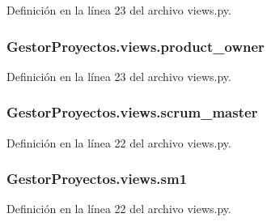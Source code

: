 Definición en la línea 23 del archivo views.\+py.

\subsubsection[{\texorpdfstring{product\+\_\+owner}{product_owner}}]{\setlength{\rightskip}{0pt plus 5cm}Gestor\+Proyectos.\+views.\+product\+\_\+owner}\hypertarget{namespace_gestor_proyectos_1_1views_af053fb672be58c4e3935d45fb8e565fc}{}\label{namespace_gestor_proyectos_1_1views_af053fb672be58c4e3935d45fb8e565fc}


Definición en la línea 23 del archivo views.\+py.

\subsubsection[{\texorpdfstring{scrum\+\_\+master}{scrum_master}}]{\setlength{\rightskip}{0pt plus 5cm}Gestor\+Proyectos.\+views.\+scrum\+\_\+master}\hypertarget{namespace_gestor_proyectos_1_1views_a9501b7c365d51492541688d20e7d8606}{}\label{namespace_gestor_proyectos_1_1views_a9501b7c365d51492541688d20e7d8606}


Definición en la línea 22 del archivo views.\+py.

\subsubsection[{\texorpdfstring{sm1}{sm1}}]{\setlength{\rightskip}{0pt plus 5cm}Gestor\+Proyectos.\+views.\+sm1}\hypertarget{namespace_gestor_proyectos_1_1views_ae2f936dc5e0da0aea0e04da7daf72971}{}\label{namespace_gestor_proyectos_1_1views_ae2f936dc5e0da0aea0e04da7daf72971}


Definición en la línea 22 del archivo views.\+py.


